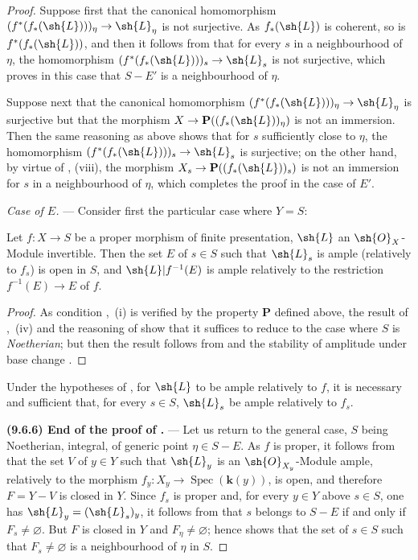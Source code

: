 \begin{proof}
Suppose first that the canonical homomorphism $(f^*(f_*(\sh{L})))_\eta\to\sh{L}_\eta$ is not surjective.
As $f_*(\sh{L})$ is coherent, so is $f^*(f_*(\sh{L}))$, and then it follows from  that for every $s$ in a neighbourhood of $\eta$, the homomorphism $(f^*(f_*(\sh{L})))_s\to\sh{L}_s$ is not surjective, which proves in this case that $S-E'$ is a neighbourhood of $\eta$.

Suppose next that the canonical homomorphism $(f^*(f_*(\sh{L})))_\eta\to\sh{L}_\eta$ is surjective but that the morphism $X\to\mathbf{P}((f_*(\sh{L}))_\eta)$ is not an immersion.
Then the same reasoning as above shows that for $s$ sufficiently close to $\eta$, the homomorphism $(f^*(f_*(\sh{L})))_s\to\sh{L}_s$ is surjective; on the other hand, by virtue of , (viii), the morphism $X_s\to\mathbf{P}((f_*(\sh{L}))_s)$ is not an immersion for $s$ in a neighbourhood of $\eta$, which completes the proof in the case of $E'$.

\emph{Case of $E$.} --- Consider first the particular case where $Y=S$:

\begin{corollary}[9.6.4]
\label{IV.9.6.4}
Let $f:X\to S$ be a proper morphism of finite presentation, $\sh{L}$ an $\sh{O}_X$-Module invertible.
Then the set $E$ of $s\in S$ such that $\sh{L}_s$ is ample (relatively to $f_s$) is open in $S$, and $\sh{L}|f^{-1}(E)$ is ample relatively to the restriction $f^{-1}(E)\to E$ of $f$.
\end{corollary}

\begin{proof}
As condition ,~(i) is verified by the property $\mathbf{P}$ defined above, the result of ,~(iv) and the reasoning of  show that it suffices to reduce to the case where $S$ is \emph{Noetherian}; but then the result follows from  and the stability of amplitude under base change .
\end{proof}

\begin{corollary}[9.6.5]
\label{IV.9.6.5}
Under the hypotheses of , for $\sh{L}$ to be ample relatively to $f$, it is necessary and sufficient that, for every $s\in S$, $\sh{L}_s$ be ample relatively to $f_s$.
\end{corollary}

\label{IV.9.6.6}%
\textbf{(9.6.6) End of the proof of .} ---
Let us return to the general case, $S$ being Noetherian, integral, of generic point $\eta\in S-E$.
As $f$ is proper, it follows from  that the set $V$ of $y\in Y$ such that $\sh{L}_y$ is an $\sh{O}_{X_y}$-Module ample, relatively to the morphism $f_y:X_y\to\operatorname{Spec}(\boldsymbol{k}(y))$, is open, and therefore $F=Y-V$ is closed in $Y$.
Since $f_s$ is proper and, for every $y\in Y$ above $s\in S$, one has
$\sh{L}_y=(\sh{L}_s)_y$, it follows from  that $s$ belongs to
$S-E$ if and only if $F_s\neq\varnothing$.
But $F$ is closed in $Y$ and $F_\eta\neq\varnothing$; hence  shows
that the set of $s\in S$ such that $F_s\neq\varnothing$ is a neighbourhood of
$\eta$ in $S$.
\end{proof}

